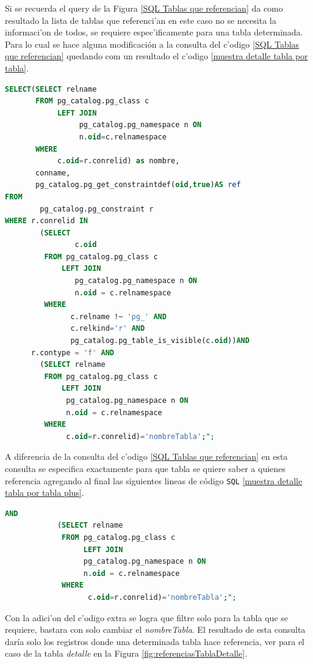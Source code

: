 Si se recuerda el query de la Figura \ref{SQL Tablas que referencian} da como resultado la lista de tablas que referenci'an en este caso no se necesita la informaci'on de todos, se requiere espec'ificamente para una tabla determinada. Para lo cual se hace alguna modificaci\'on a la consulta del c'odigo \ref{SQL Tablas que referencian} quedando com un resultado el c'odigo \ref{muestra detalle tabla por tabla}.

\begin{lstlisting}[caption={Query para detalle referencias para una tabla},label={muestra detalle tabla por tabla},language=sql]
SELECT(SELECT relname
       FROM pg_catalog.pg_class c 
            LEFT JOIN 
                 pg_catalog.pg_namespace n ON 
                 n.oid=c.relnamespace
       WHERE
            c.oid=r.conrelid) as nombre,
       conname,
       pg_catalog.pg_get_constraintdef(oid,true)AS ref 
FROM
        pg_catalog.pg_constraint r 
WHERE r.conrelid IN
        (SELECT 
                c.oid 
         FROM pg_catalog.pg_class c 
             LEFT JOIN
                pg_catalog.pg_namespace n ON 
                n.oid = c.relnamespace 
         WHERE 
               c.relname !~ 'pg_' AND 
               c.relkind='r' AND 
               pg_catalog.pg_table_is_visible(c.oid))AND
      r.contype = 'f' AND 
        (SELECT relname 
         FROM pg_catalog.pg_class c 
             LEFT JOIN
              pg_catalog.pg_namespace n ON
              n.oid = c.relnamespace 
         WHERE
              c.oid=r.conrelid)='nombreTabla';";
\end{lstlisting}
A diferencia de la consulta del c'odigo \ref{SQL Tablas que referencian} en esta consulta se especifica exactamente para que tabla se quiere saber a quienes referencia agregando al final las siguientes lineas de c\'odigo \texttt{SQL} \ref{muestra detalle tabla por tabla plus}.

\begin{lstlisting}[caption={Parte que determina para una tabla},label={muestra detalle tabla por tabla plus},language=sql]
           AND 
            (SELECT relname 
             FROM pg_catalog.pg_class c 
                  LEFT JOIN
                  pg_catalog.pg_namespace n ON
                  n.oid = c.relnamespace 
             WHERE
                   c.oid=r.conrelid)='nombreTabla';";
\end{lstlisting}
Con la adici'on del c'odigo extra se logra que filtre solo para la tabla que se requiere, bastara con solo cambiar el \textit{nombreTabla}.
El resultado de esta consulta  dar\'ia solo los registros donde una determinada tabla hace referencia, ver para el caso de la tabla \textit{detalle} en la Figura \ref{fig:referenciasTablaDetalle}.

